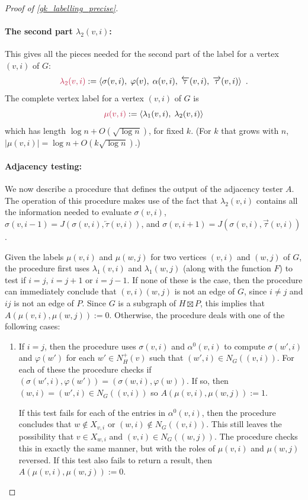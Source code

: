 \documentclass{patmorin}
\makeatletter
\def\mathcolor#1#{\@mathcolor{#1}}
\def\@mathcolor#1#2#3{%
  \protect\leavevmode
  \begingroup
    \color#1{#2}#3%
  \endgroup
}
\newcommand{\mathdefin}[1]{\mathcolor{brightmaroon}{#1}}
\newcommand{\Oh}{O}
\makeatother
\begin{document}
\begin{proof}[Proof of \cref{gk_labelling_precise}]
  \paragraph{\boldmath The second part $\lambda_2(v,i)$:}
  This gives all the pieces needed for the second part of the label for a vertex $(v,i)$ of $G$:
  \[
    \mathdefin{\lambda_2(v,i)} := \langle \sigma(v,i),\; \varphi(v),\; \alpha(v,i),\; \overleftarrow{\tau}(v,i),\; \overrightarrow{\tau}(v,i) \rangle  \enspace .
  \]
  The complete vertex label for a vertex $(v,i)$ of $G$ is
  \[
    \mathdefin{\mu(v,i)} := \langle \lambda_1(v,i),\; \lambda_2(v,i) \rangle
  \]
  which has length $\log n + \Oh(\sqrt{\log n})$, for fixed $k$.  (For $k$ that grows with $n$, $|\mu(v,i)|=\log n + \Oh(k\sqrt{\log n})$.)

  \paragraph{\boldmath Adjacency testing:}

  We now describe a procedure that defines the output of the adjacency tester $A$.
  The operation of this procedure makes use of the fact that $\lambda_2(v,i)$ contains all the information needed to evaluate $\sigma(v,i)$, $\sigma(v,i-1)=J(\sigma(v,i),\overleftarrow{\tau}(v,i))$, and $\sigma(v,i+1)=J(\sigma(v,i),\overrightarrow{\tau}(v,i))$.

  Given the labels $\mu(v,i)$ and $\mu(w,j)$ for two vertices $(v,i)$ and $(w,j)$ of $G$, the procedure first uses $\lambda_1(v,i)$ and $\lambda_1(w,j)$ (along with the function $F$) to test if $i=j$, $i=j+1$ or $i=j-1$.  If none of these is the case, then the procedure can immediately conclude that $(v,i)(w,j)$ is not an edge of $G$, since $i\neq j$ and $ij$ is not an edge of $P$.  Since $G$ is a subgraph of $H\boxtimes P$, this implies that $A(\mu(v,i),\mu(w,j)):=0$.  Otherwise, the procedure deals with one of the following cases:
  \begin{enumerate}
    \item If $i=j$, then the procedure uses $\sigma(v,i)$ and $\alpha^0(v,i)$ to compute $\sigma(w',i)$ and $\varphi(w')$ for each $w'\in N^+_H(v)$ such that $(w',i)\in N_G((v,i))$.  For each of these the procedure checks if $(\sigma(w',i),\varphi(w'))=(\sigma(w,i),\varphi(w))$. If so, then $(w,i)=(w',i)\in N_G((v,i))$ so $A(\mu(v,i),\mu(w,j)):=1$.

    If this test fails for each of the entries in $\alpha^0(v,i)$, then the procedure concludes that $w\not\in X_{v,i}$ or $(w,i)\not\in N_G((v,i))$.  This still leaves the possibility that $v\in X_{w,i}$ and $(v,i)\in N_G((w,j))$.  The procedure checks this in exactly the same manner, but with the roles of $\mu(v,i)$ and $\mu(w,j)$ reversed.  If this test also fails to return a result, then $A(\mu(v,i),\mu(w,j)):=0$.


\end{enumerate}
\end{proof}
\end{document}
